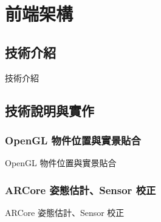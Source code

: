 \chapter{前端架構}
\section{技術介紹}

    技術介紹

\section{技術說明與實作}
\subsection{OpenGL 物件位置與實景貼合}

    OpenGL 物件位置與實景貼合

\subsection{ARCore 姿態估計、Sensor 校正}

    ARCore 姿態估計、Sensor 校正
